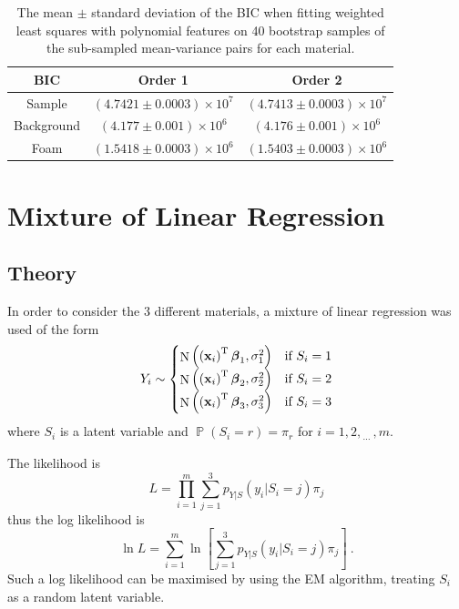 \documentclass[12pt]{report}
\DeclareMathOperator{\prob}{\mathbb{P}}
\DeclareMathOperator{\normal}{N}
\newcommand{\T}{^\textup{T}}
\newcommand{\dotdotdot}{_{\phantom{.}\cdots}}
\newcommand{\vect}[1]{\mathbf{#1}}
\newcommand{\vectGreek}[1]{\boldsymbol{#1}}
\begin{document}
\begin{table}
	\centering
	\begin{tabular}{ c | c c  }
		BIC & Order 1 & Order 2 \\
		\hline
		Sample & $(4.7421\pm0.0003)\times 10^7$ & $(4.7413\pm0.0003)\times 10^7$ \\
		Background & $(4.177\pm0.001)\times 10^6$ & $(4.176\pm0.001)\times 10^6$ \\
		Foam & $(1.5418\pm0.0003)\times 10^6$ & $(1.5403\pm0.0003)\times 10^6$
	\end{tabular}
	\caption{The mean $\pm$ standard deviation of the BIC when fitting weighted least squares with polynomial features on 40 bootstrap samples of the sub-sampled mean-variance pairs for each material.}
	\label{table:subsample_BIC}
\end{table}

\section{Mixture of Linear Regression}
\subsection{Theory}
In order to consider the 3 different materials, a mixture of linear regression was used of the form
\begin{equation}
Y_i\sim
\begin{cases}
\normal\left(\left(\vect{x}_i\right)\T\vectGreek{\beta}_1,\sigma_1^2\right) & \text{if }S_i=1\\ 
\normal\left(\left(\vect{x}_i\right)\T\vectGreek{\beta}_2,\sigma_2^2\right) & \text{if }S_i=2\\ 
\normal\left(\left(\vect{x}_i\right)\T\vectGreek{\beta}_3,\sigma_3^2\right) & \text{if }S_i=3\\
\end{cases}
\end{equation}
where $S_i$ is a latent variable and $\prob\left(S_i=r\right)=\pi_r$ for $i=1,2,\dotdotdot,m$.

The likelihood is
\begin{equation}
L=\prod_{i=1}^m\sum_{j=1}^3p_{Y|S}\left(y_i|S_i=j\right)\pi_j
\end{equation}
thus the log likelihood is
\begin{equation}
\ln{L}=\sum_{i=1}^m\ln\left[
\sum_{j=1}^3p_{Y|S}\left(y_i|S_i=j\right)\pi_j
\right] \ .
\end{equation}
Such a log likelihood can be maximised by using the EM algorithm, treating $S_i$ as a random latent variable.
\end{document}
